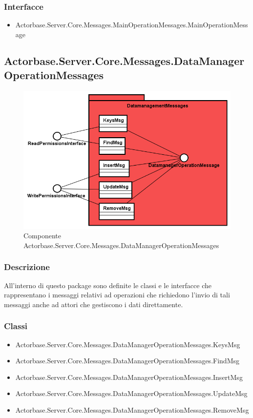 \documentclass[a4paper]{article}
\begin{document}
			\subsubsection{Interfacce}
			\begin{itemize}
				\item Actorbase.Server.Core.Messages.MainOperationMessages.MainOperationMessage
			\end{itemize}
			
		\subsection{Actorbase.Server.Core.Messages.DataManagerOperationMessages}
			\begin{figure} [H]
			\centering
			\includegraphics[scale=0.50]{Server/Package/DatamanagementMessagesLevel.png}
			\caption{Componente Actorbase.Server.Core.Messages.DataManagerOperationMessages}
			\end{figure}
			\subsubsection{Descrizione}
				All'interno di questo package sono definite le classi e le interfacce che rappresentano i messaggi relativi ad operazioni che richiedono l'invio di tali messaggi anche ad attori che gestiscono i dati direttamente.
			\subsubsection{Classi}
			\begin{itemize}
				\item Actorbase.Server.Core.Messages.DataManagerOperationMessages.KeysMsg
				\item Actorbase.Server.Core.Messages.DataManagerOperationMessages.FindMsg
				\item Actorbase.Server.Core.Messages.DataManagerOperationMessages.InsertMsg
				\item Actorbase.Server.Core.Messages.DataManagerOperationMessages.UpdateMsg
				\item Actorbase.Server.Core.Messages.DataManagerOperationMessages.RemoveMsg
			\end{itemize}
\end{document}
